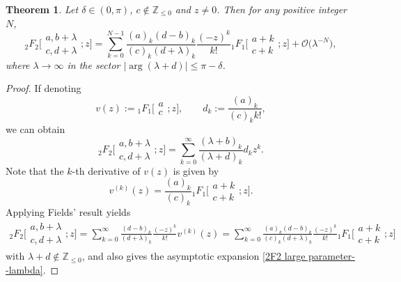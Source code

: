 \documentclass[pdftex]{sigma}
\numberwithin{equation}{section}
\newtheorem{Theorem}{Theorem}[section]
\newcommand{\ZZ}{\ensuremath{\mathbb{Z}}}
\newcommand{\mo}{\mathcal{O}}
\begin{document}
\begin{Theorem}\label{Thm: 2F2 large parameter--lambda}
	Let $\delta\in (0,\pi)$, $c\notin\ZZ_{\leqslant 0}$ and $z\ne 0$. Then for any positive integer $N$,
	\begin{equation}\label{2F2 large parameter--lambda}
		{}_2F_2\biggl[\begin{matrix}
			a,b+\lambda\\
			c,d+\lambda
		\end{matrix};z\biggr]=\sum_{k=0}^{N-1}\frac{(a)_k (d-b )_k}{(c)_k (d+\lambda )_k}\frac{ (-z )^k}{k!}{}_1F_1\biggl[\begin{matrix}
			a+k\\
			c+k
		\end{matrix};z\biggr]+\mo \bigl(\lambda^{-N} \bigr),
	\end{equation}
	where $\lambda\to\infty$ in the sector $|{\arg}(\lambda+d)|\leqslant \pi-\delta$.
\end{Theorem}

\begin{proof}
	If denoting
	\[v(z):={}_1F_1\biggl[\begin{matrix}
		a\\
		c
	\end{matrix};z\biggr],\qquad d_k:=\frac{(a)_k}{(c)_k k!},\]
	we can obtain
	\[{}_2F_2\biggl[\begin{matrix}
		a,b+\lambda\\
		c,d+\lambda
	\end{matrix};z\biggr]=\sum_{k=0}^{\infty}\frac{ (\lambda+b )_k}{ (\lambda+d )_k}d_k z^k.\]
	Note that the $k$-th derivative of $v(z)$ is given by \cite[p.~405, equation~(16.3.1)]{NIST-Handbook}
	\[v^{(k)}(z)=\frac{(a)_k}{(c)_k}
	{}_1F_1\biggl[\begin{matrix}
		a+k\\
		c+k
	\end{matrix};z\biggr].\]
	Applying Fields' result \cite[Theorem 3]{Fields-1967} yields
	\begin{gather}\label{2F2 transformation}
		{}_2F_2\biggl[\begin{matrix}
			a,b+\lambda\\
			c,d+\lambda
		\end{matrix};z\biggr]=\sum_{k=0}^{\infty}\frac{(d-b)_k}{(d+\lambda)_k}\frac{(-z)^k}{k!}v^{(k)}(z)=\sum_{k=0}^{\infty}\frac{(a)_k(d-b)_k}{(c)_k(d+\lambda)_k}\frac{(-z)^k}{k!}{}_1F_1\biggl[\begin{matrix}
			a+k\\
			c+k
		\end{matrix};z\biggr]
	\end{gather}
	with $\lambda+d\notin\ZZ_{\leqslant 0}$, and also gives the asymptotic expansion \eqref{2F2 large parameter--lambda}.
\end{proof}
\end{document}

